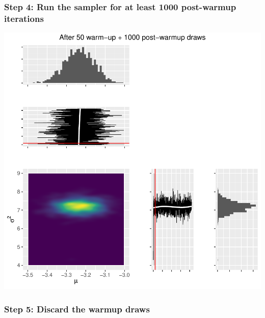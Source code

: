\documentclass[
  11pt,
]{article}
\begin{document}
\hypertarget{step-4-run-the-sampler-for-at-least-1000-post-warmup-iterations}{%
\subsubsection{Step 4: Run the sampler for at least 1000 post-warmup iterations}\label{step-4-run-the-sampler-for-at-least-1000-post-warmup-iterations}}

\begin{center}\includegraphics{01-02-lec_files/figure-latex/posterior-full-1} \end{center}

\hypertarget{step-5-discard-the-warmup-draws}{%
\subsubsection{Step 5: Discard the warmup draws}\label{step-5-discard-the-warmup-draws}}
\end{document}
